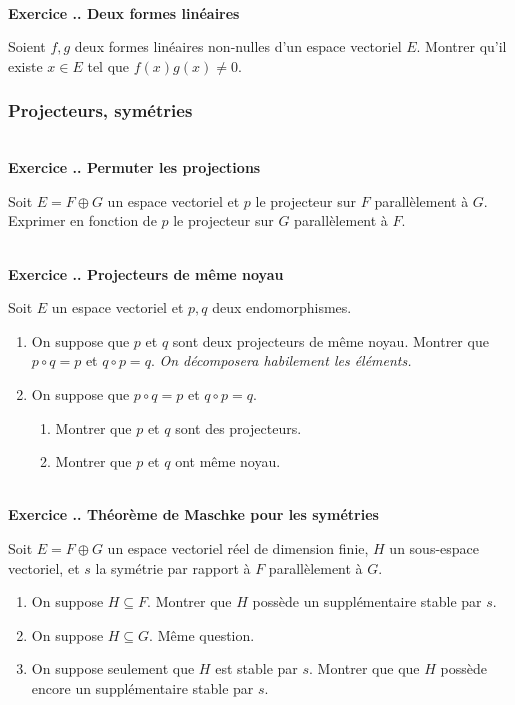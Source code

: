 \documentclass{article}
\newcounter{exo}
\newcommand{\exercice}[1][\null]{\textbf{\\ Exercice \thesection.\theexo. #1} \addtocounter{exo}{1}}
\begin{document}
\exercice[Deux formes linéaires]

Soient $f,g$ deux formes linéaires non-nulles d'un espace vectoriel $E$. Montrer qu'il existe $x \in E$ tel que $f(x)g(x) \neq 0$.


\subsubsection{Projecteurs, symétries}




\exercice[Permuter les projections]

Soit $E = F \oplus G$ un espace vectoriel et $p$ le projecteur sur $F$ parallèlement à $G$. Exprimer en fonction de $p$ le projecteur sur $G$ parallèlement à $F$.



\exercice[Projecteurs de même noyau]

Soit $E$ un espace vectoriel et $p,q$ deux endomorphismes.

\begin{enumerate}

\item On suppose que $p$ et $q$ sont deux projecteurs de même noyau. Montrer que $p \circ q = p$ et $q \circ p = q$. \emph{On décomposera habilement les éléments.}

\item On suppose que $p \circ q = p$ et $q \circ p = q$.

\begin{enumerate}

\item Montrer que $p$ et $q$ sont des projecteurs.

\item Montrer que $p$ et $q$ ont même noyau.

\end{enumerate}

\end{enumerate}



\exercice[Théorème de Maschke pour les symétries]

Soit $E =  F \oplus G$ un espace vectoriel réel de dimension finie, $H$ un sous-espace vectoriel, et $s$ la symétrie par rapport à $F$ parallèlement à $G$.

\begin{enumerate}

\item On suppose $H \subseteq F$. Montrer que $H$ possède un supplémentaire stable par $s$.

\item On suppose $H \subseteq G$. Même question.

\item On suppose seulement que $H$ est stable par $s$. Montrer que que $H$ possède encore un supplémentaire stable par $s$.

\end{enumerate}
\end{document}
